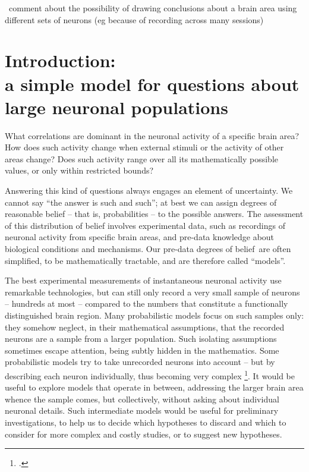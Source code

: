 \documentclass[\ifafour a4paper,12pt,\else a5paper,10pt,\fi%
onecolumn,oneside,article,%
british%
]{memoir}
\theoremstyle{remark}
\theoremstyle{innote}
\newcommand*{\citep}{\footcites}
\renewcommand*{\|}{\nonscript\,\vert\nonscript\;\mathopen{}}
\newcommand*{\puzzle}{{\fontencoding{U}\fontfamily{fontawesometwo}\selectfont\symbol{225}}}
\newcommand{\mynote}[1]{ {\color{notecolour}\puzzle\ #1}}
\newcommand*{\dobs}{degrees of belief}
\begin{document}

\mynote{comment about the possibility of drawing conclusions about a brain
  area using different sets of neurons (eg because of recording across many
  sessions)}


\section{Introduction:\\a simple model for questions about large neuronal
  populations}
\label{sec:intro}

What correlations are dominant in the neuronal activity of a specific brain
area? How does such activity change when external stimuli or the activity
of other areas change? Does such activity range over all its mathematically
possible values, or only within restricted bounds?

Answering this kind of questions always engages an element of uncertainty.
We cannot say \enquote{the answer is such and such}; at best we can assign
degrees of reasonable belief -- that is, probabilities -- to the possible
answers. The assessment of this distribution of belief involves
experimental data, such as recordings of neuronal activity from specific
brain areas, and pre-data knowledge about biological conditions and
mechanisms. Our pre-data \dobs\ are often simplified, to be mathematically
tractable, and are therefore called \enquote{models}.

The best experimental measurements of instantaneous neuronal activity use
remarkable technologies, but can still only record a very small sample of
neurons -- hundreds at most -- compared to the numbers that constitute a
functionally distinguished brain region. Many probabilistic models focus on
such samples only: they somehow neglect, in their mathematical assumptions,
that the recorded neurons are a sample from a larger population. Such
isolating assumptions sometimes escape attention, being subtly hidden in
the mathematics. Some probabilistic models try to take unrecorded neurons
into account -- but by describing each neuron individually, thus becoming
very complex \citep{huang2015,battistinetal2017}. It would be useful to
explore models that operate in between, addressing the larger brain area
whence the sample comes, but collectively, without asking about individual
neuronal details. Such intermediate models would be useful for preliminary
investigations, to help us to decide which hypotheses to discard and which
to consider for more complex and costly studies, or to suggest new
hypotheses.
\end{document}

